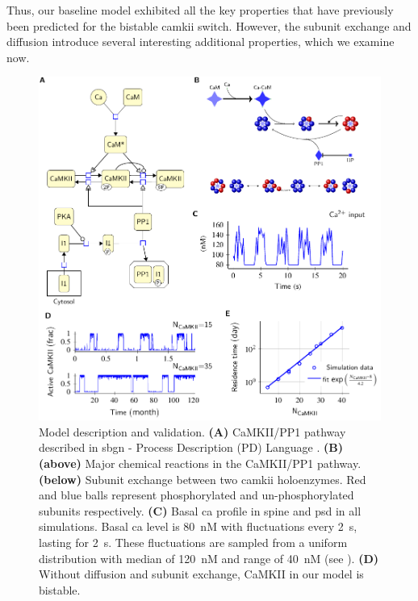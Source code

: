 \documentclass[9pt,lineno]{elife}
\begin{document}
Thus, our baseline model exhibited all the key properties that have
previously been predicted for the bistable \gls{camkii} switch. However, the
subunit exchange and diffusion introduce several interesting additional
properties, which we examine now.

\begin{figure}[t]%
    \includegraphics[width=0.95\linewidth]{./PaperFigures/elifeFigure1/figure_validation_178mm.pdf}
    \caption{Model description and validation. \textbf{(A)} CaMKII/PP1
        pathway described in \gls{sbgn} - Process Description (PD) Language \citep{novere_systems_2009}. 
        \textbf{(B)} \textbf{(above)} Major chemical reactions in the CaMKII/PP1 pathway. 
        \textbf{(below)} Subunit exchange between two \gls{camkii} holoenzymes. Red
        and blue balls represent phosphorylated and un-phosphorylated subunits
        respectively.  \textbf{(C)} Basal \gls{ca} profile in spine and
        \gls{psd} in all simulations. Basal \gls{ca} level is \SI{80}{\nano M} with fluctuations
        every \SI{2}{\second}, lasting for \SI{2}{\second}. These fluctuations are sampled from a uniform
        distribution with median of \SI{120}{\nano M} and range  of
        \SI{40}{\nano M} (see ).
        \textbf{(D)} Without diffusion and subunit exchange, CaMKII in our model is bistable.
}
\end{figure}
\end{document}
